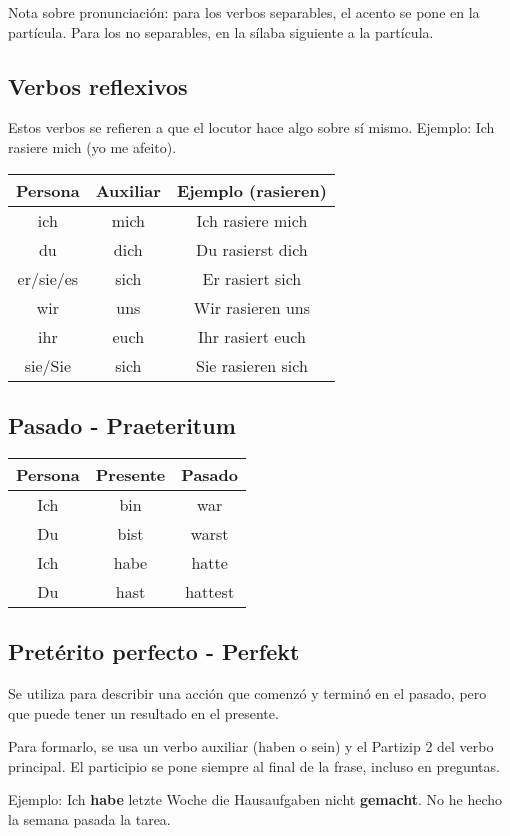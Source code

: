 Nota sobre pronunciación: para los verbos separables, el acento se pone en la partícula. Para los no separables, en la sílaba siguiente a la partícula.

\subsection{Verbos reflexivos}
Estos verbos se refieren a que el locutor hace algo sobre sí mismo. Ejemplo: Ich rasiere mich (yo me afeito).

\begin{tabular}{|c | c c |}
\hline
\textbf{Persona} & \textbf{Auxiliar} & \textbf{Ejemplo (rasieren)}\\
\hline
ich & mich & Ich rasiere mich\\
du & dich & Du rasierst dich\\
er/sie/es & sich & Er rasiert sich\\
wir & uns & Wir rasieren uns\\
ihr & euch & Ihr rasiert euch \\
sie/Sie & sich & Sie rasieren sich\\
\hline
\end{tabular}

\subsection{Pasado - Praeteritum}
\begin{tabular}{|c | c c |}
\hline
\textbf{Persona} & \textbf{Presente} & \textbf{Pasado}\\
\hline
Ich & bin & war \\
Du & bist & warst \\
Ich & habe & hatte \\
Du & hast & hattest \\
\hline
\end{tabular}

\subsection{Pretérito perfecto - Perfekt}
Se utiliza para describir una acción que comenzó y terminó en el pasado, pero que puede tener un resultado en el presente.

Para formarlo, se usa un verbo auxiliar (haben o sein) y el Partizip 2 del verbo principal. El participio se pone siempre al final de la frase, incluso en preguntas.

Ejemplo: Ich \textbf{habe} letzte Woche die Hausaufgaben nicht \textbf{gemacht}. No he hecho la semana pasada la tarea.


